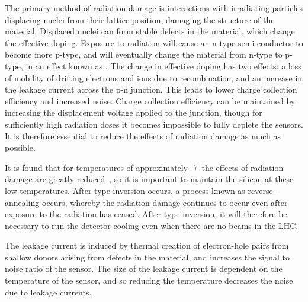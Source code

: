 The primary method of radiation damage is interactions with irradiating
particles displacing nuclei from their lattice position, damaging the structure
of the material. Displaced nuclei can form stable defects in the material, which
change the effective doping. Exposure to radiation will cause an n-type
semi-conductor to become more p-type, and will eventually change the material
from n-type to p-type, in an effect known as .  The change
in effective doping has two effects: a loss of mobility of drifting electrons
and ions due to recombination, and an increase in the leakage current across the
p-n junction. This leads to lower charge collection efficiency and increased noise.
Charge collection efficiency can be maintained by increasing the displacement
voltage applied to the junction, though for sufficiently high radiation doses it
becomes impossible to fully deplete the sensors. It is therefore essential to
reduce the effects of radiation damage as much as possible.
 

It is found that for temperatures of approximately -7\dc\ the effects of
radiation damage are greatly reduced~\cite{Lindstrom2001308}, so it is important
to maintain the silicon at these low temperatures. After type-inversion occurs,
a process known as reverse-annealing occurs, whereby the radiation damage
continues to occur even after exposure to the radiation has ceased. After
type-inversion, it will therefore be necessary to run the detector cooling even
when there are no beams in the LHC.

The leakage current is induced by thermal creation of electron-hole pairs from
shallow donors arising from defects in the material, and increases the signal to
noise ratio of the sensor. The size of the leakage current is dependent on
the temperature of the sensor, and so reducing the temperature decreases the noise due to leakage
currents.

